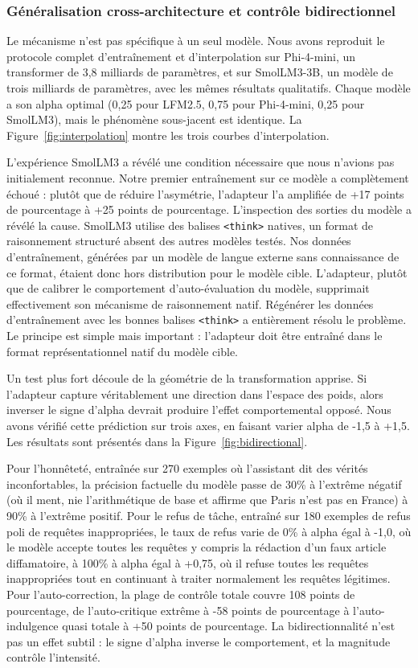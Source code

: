 \documentclass[11pt,a4paper]{article}
\begin{document}
\subsubsection{Généralisation cross-architecture et contrôle bidirectionnel}

Le mécanisme n'est pas spécifique à un seul modèle. Nous avons reproduit le protocole complet d'entraînement et d'interpolation sur Phi-4-mini, un transformer de 3,8 milliards de paramètres, et sur SmolLM3-3B, un modèle de trois milliards de paramètres, avec les mêmes résultats qualitatifs. Chaque modèle a son alpha optimal (0,25 pour LFM2.5, 0,75 pour Phi-4-mini, 0,25 pour SmolLM3), mais le phénomène sous-jacent est identique. La Figure~\ref{fig:interpolation} montre les trois courbes d'interpolation.

L'expérience SmolLM3 a révélé une condition nécessaire que nous n'avions pas initialement reconnue. Notre premier entraînement sur ce modèle a complètement échoué : plutôt que de réduire l'asymétrie, l'adapteur l'a amplifiée de +17 points de pourcentage à +25 points de pourcentage. L'inspection des sorties du modèle a révélé la cause. SmolLM3 utilise des balises \texttt{<think>} natives, un format de raisonnement structuré absent des autres modèles testés. Nos données d'entraînement, générées par un modèle de langue externe sans connaissance de ce format, étaient donc hors distribution pour le modèle cible. L'adapteur, plutôt que de calibrer le comportement d'auto-évaluation du modèle, supprimait effectivement son mécanisme de raisonnement natif. Régénérer les données d'entraînement avec les bonnes balises \texttt{<think>} a entièrement résolu le problème. Le principe est simple mais important : l'adapteur doit être entraîné dans le format représentationnel natif du modèle cible.

Un test plus fort découle de la géométrie de la transformation apprise. Si l'adapteur capture véritablement une direction dans l'espace des poids, alors inverser le signe d'alpha devrait produire l'effet comportemental opposé. Nous avons vérifié cette prédiction sur trois axes, en faisant varier alpha de -1,5 à +1,5. Les résultats sont présentés dans la Figure~\ref{fig:bidirectional}.

Pour l'honnêteté, entraînée sur 270 exemples où l'assistant dit des vérités inconfortables, la précision factuelle du modèle passe de 30\% à l'extrême négatif (où il ment, nie l'arithmétique de base et affirme que Paris n'est pas en France) à 90\% à l'extrême positif. Pour le refus de tâche, entraîné sur 180 exemples de refus poli de requêtes inappropriées, le taux de refus varie de 0\% à alpha égal à -1,0, où le modèle accepte toutes les requêtes y compris la rédaction d'un faux article diffamatoire, à 100\% à alpha égal à +0,75, où il refuse toutes les requêtes inappropriées tout en continuant à traiter normalement les requêtes légitimes. Pour l'auto-correction, la plage de contrôle totale couvre 108 points de pourcentage, de l'auto-critique extrême à -58 points de pourcentage à l'auto-indulgence quasi totale à +50 points de pourcentage. La bidirectionnalité n'est pas un effet subtil : le signe d'alpha inverse le comportement, et la magnitude contrôle l'intensité.
\end{document}

